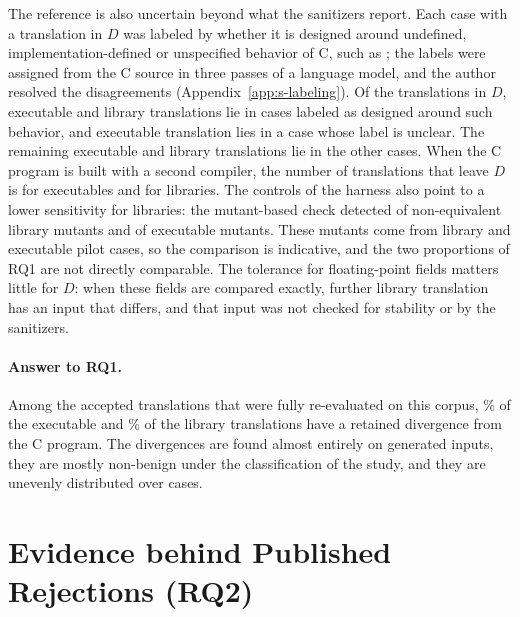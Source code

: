 The reference is also uncertain beyond what the sanitizers report. Each case with a translation in $D$ was labeled by whether it is designed around undefined, implementation-defined or unspecified behavior of C, such as ; the labels were assigned from the C source in three passes of a language model, and the author resolved the disagreements (Appendix~\ref{app:s-labeling}). Of the translations in $D$, \rqBThreeDYesExeAllNum{} executable and \rqBThreeDYesLibAllNum{} library translations lie in cases labeled as designed around such behavior, and \rqBThreeDUnclearExeAllNum{} executable translation lies in a case whose label is unclear. The remaining  executable and  library translations lie in the other cases. When the C program is built with a second compiler, the number of translations that leave $D$ is \rqBOneLeaveExeAllNum{} for executables and \rqBOneLeaveLibAllNum{} for libraries. The controls of the harness also point to a lower sensitivity for libraries: the mutant-based check detected \sMutLibK{} of \sMutLibN{} non-equivalent library mutants and \sMutExeK{} of \sMutExeN{} executable mutants. These mutants come from \sMutLibNCases{} library and \sMutExeNCases{} executable pilot cases, so the comparison is indicative, and the two proportions of RQ1 are not directly comparable. The tolerance for floating-point fields matters little for $D$: when these fields are compared exactly, \rqExactTransLibAllNum{} further library translation has an input that differs, and that input was not checked for stability or by the sanitizers.

\paragraph{Answer to RQ1.} Among the accepted translations that were fully re-evaluated on this corpus, \rqFPExeAllPct\% of the executable and \rqFPLibAllPct\% of the library translations have a retained divergence from the C program. The divergences are found almost entirely on generated inputs, they are mostly non-benign under the classification of the study, and they are unevenly distributed over cases.

\section{Evidence behind Published Rejections (RQ2)}\label{sec:r-rq2}

